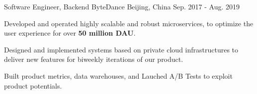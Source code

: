 
\begin{cventries}

  \cventry
    {Software Engineer, Backend} %
    {ByteDance} %
    {Beijing, China} %
    {Sep. 2017 - Aug. 2019} %
    {
      \begin{cvitems} 
        \item{Developed and operated highly scalable and robust microservices, to optimize the user experience for over \textbf{50 million DAU}.}
        \item {Designed and implemented systems based on private cloud infrastructures to deliver new features for biweekly iterations of our product.}  
        \item {Built product metrics, data warehouses, and Lauched A/B Tests to exploit product potentials.}
      \end{cvitems}
    }


\end{cventries}
